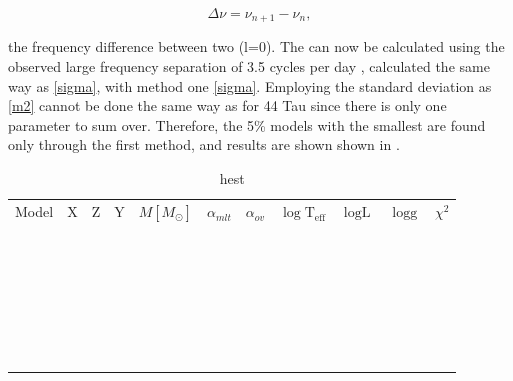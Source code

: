 \begin{equation}
    \Delta\nu = \nu_{n+1} - \nu_{n},
\end{equation}

\noindent the frequency difference between two (l=0).  The \chis can now be calculated using the observed large frequency separation of 3.5 cycles per day \citep{antoci2014role}, calculated the same way as  \eqref{sigma}, with method one \eqref{sigma}. Employing the standard deviation as \eqref{m2} cannot be done the same way as for 44 Tau since there is only one parameter to sum over. Therefore, the 5\% models with the smallest \chis are found only through the first method, and results are shown shown in .

\begin{table}[htbp]
  \caption{hest}
  \label{tab:superstar}

\begin{tabular}{lllllllllll}
\label{bestchi}
 Model & X & Z & Y & $M[M_\odot]$ & $\alpha_{mlt}$ & $\alpha_{ov}$ & $\log \text{T}_\text{eff}$  & $\log \text{L}$  & $\log \text{g}$ & $\chi^2$ \\
 &  &  &  &  &  &  &  &  &  &  \\
 &  &  &  &  &  &  &  &  &  &  \\
 &  &  &  &  &  &  &  &  &  &  \\
 &  &  &  &  &  &  &  &  &  &  \\
 &  &  &  &  &  &  &  &  &  &  \\
 &  &  &  &  &  &  &  &  &  &  \\
 &  &  &  &  &  &  &  &  &  &  \\
 &  &  &  &  &  &  &  &  &  &  \\
 &  &  &  &  &  &  &  &  &  &  \\
 &  &  &  &  &  &  &  &  &  &  \\
 &  &  &  &  &  &  &  &  &  &  \\
 &  &  &  &  &  &  &  &  &  &  \\
 &  &  &  &  &  &  &  &  &  &  \\
 &  &  &  &  &  &  &  &  &  &  \\
 &  &  &  &  &  &  &  &  &  &  \\
 &  &  &  &  &  &  &  &  &  &  \\
 &  &  &  &  &  &  &  &  &  &  \\
 &  &  &  &  &  &  &  &  &  &  \\
 &  &  &  &  &  &  &  &  &  &  \\
 &  &  &  &  &  &  &  &  &  &  \\
 &  &  &  &  &  &  &  &  &  &  \\
 &  &  &  &  &  &  &  &  &  &  \\
 &  &  &  &  &  &  &  &  &  &  \\
 &  &  &  &  &  &  &  &  &  &  \\
 &  &  &  &  &  &  &  &  &  &  \\
 &  &  &  &  &  &  &  &  &  &  \\
 &  &  &  &  &  &  &  &  &  &  \\
 &  &  &  &  &  &  &  &  &  & 
\end{tabular}
\end{table}

